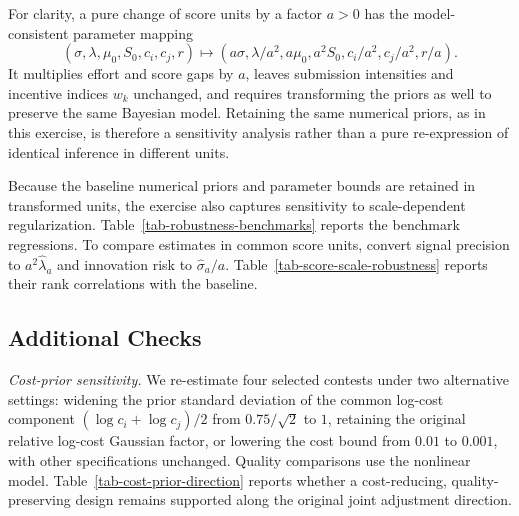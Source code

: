 \documentclass[mnsc]{informs3}
\begin{document}
\begin{APPENDICES}
\begingroup
For clarity, a pure change of score units by a factor $a>0$ has the model-consistent parameter mapping
\[
(\sigma,\lambda,\mu_0,S_0,c_i,c_j,r)
\longmapsto
(a\sigma,\lambda/a^2,a\mu_0,a^2S_0,c_i/a^2,c_j/a^2,r/a).
\]
It multiplies effort and score gaps by $a$, leaves submission intensities and incentive indices $w_k$ unchanged, and requires transforming the priors as well to preserve the same Bayesian model. Retaining the same numerical priors, as in this exercise, is therefore a sensitivity analysis rather than a pure re-expression of identical inference in different units.
\par\endgroup

Because the baseline numerical priors and parameter bounds are retained in transformed units, the exercise also captures sensitivity to scale-dependent regularization. Table~\ref{tab-robustness-benchmarks} reports the benchmark regressions.
To compare estimates in common score units, convert signal precision to $a^2\hat\lambda_a$ and innovation risk to $\hat\sigma_a/a$. Table~\ref{tab-score-scale-robustness} reports their rank correlations with the baseline.




\subsection{Additional Checks}\label{app-additional-checks}

\textit{Cost-prior sensitivity.} We re-estimate four selected contests under two alternative settings: {widening the prior standard deviation of the common log-cost component $(\log c_i+\log c_j)/2$ from $0.75/\sqrt{2}$ to $1$, retaining the original relative log-cost Gaussian factor}, or lowering the cost bound from $0.01$ to $0.001$, with other specifications unchanged. Quality comparisons use the nonlinear model. Table~\ref{tab-cost-prior-direction} reports whether a cost-reducing, quality-preserving design remains supported along the original joint adjustment direction.


\end{APPENDICES}
\end{document}
